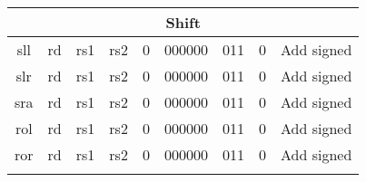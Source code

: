\documentclass{article}
\begin{document}
\begin{center}
\begin{longtable}{|c|l|r|l|r|l|r|l|r|l|r|l|r|c|c|}
                    \multicolumn{15}{|c|}{Shift} \\ 
    \hline sll  &   \multicolumn{2}{|c|}{rd}            &   \multicolumn{2}{|c|}{rs1}       &   \multicolumn{2}{|c|}{rs2}           &   \multicolumn{2}{|c|}{0}             &   \multicolumn{2}{|c|}{000000}    &   \multicolumn{2}{|c|}{011}       &   0       &   Add signed \\
    \hline slr  &   \multicolumn{2}{|c|}{rd}            &   \multicolumn{2}{|c|}{rs1}       &   \multicolumn{2}{|c|}{rs2}           &   \multicolumn{2}{|c|}{0}             &   \multicolumn{2}{|c|}{000000}    &   \multicolumn{2}{|c|}{011}       &   0       &   Add signed \\
    \hline sra  &   \multicolumn{2}{|c|}{rd}            &   \multicolumn{2}{|c|}{rs1}       &   \multicolumn{2}{|c|}{rs2}           &   \multicolumn{2}{|c|}{0}             &   \multicolumn{2}{|c|}{000000}    &   \multicolumn{2}{|c|}{011}       &   0       &   Add signed \\
    \hline rol  &   \multicolumn{2}{|c|}{rd}            &   \multicolumn{2}{|c|}{rs1}       &   \multicolumn{2}{|c|}{rs2}           &   \multicolumn{2}{|c|}{0}             &   \multicolumn{2}{|c|}{000000}    &   \multicolumn{2}{|c|}{011}       &   0       &   Add signed \\
    \hline ror  &   \multicolumn{2}{|c|}{rd}            &   \multicolumn{2}{|c|}{rs1}       &   \multicolumn{2}{|c|}{rs2}           &   \multicolumn{2}{|c|}{0}             &   \multicolumn{2}{|c|}{000000}    &   \multicolumn{2}{|c|}{011}       &   0       &   Add signed \\


    \hline          \multicolumn{15}{|c|}{} \\
    

\end{longtable}
\end{center}
\end{document}

